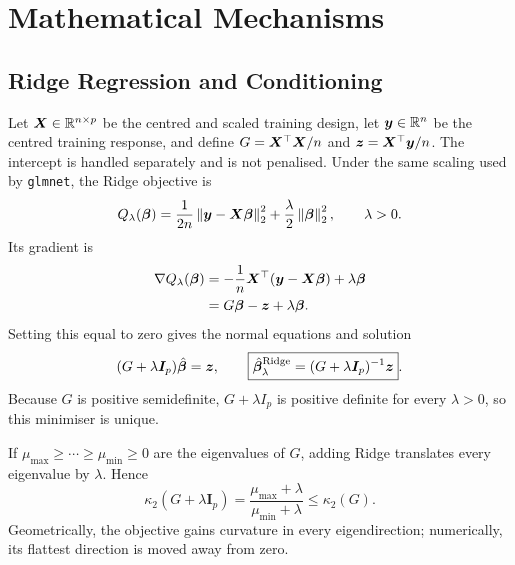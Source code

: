 \section{Mathematical Mechanisms}
\label{sec:math}

\subsection{Ridge Regression and Conditioning}
\label{sec:ridge-math}

Let $\bm{X}\in\mathbb{R}^{n\times p}$ be the centred and scaled training design, let
$\bm{y}\in\mathbb{R}^n$ be the centred training response, and define
$G=\bm{X}^\top\bm{X}/n$ and $\bm{z}=\bm{X}^\top\bm{y}/n$.  The intercept is handled
separately and is not penalised.  Under the same scaling used by
\texttt{glmnet}, the Ridge objective is
\begin{equation}
\label{eq:ridge-obj}
 Q_\lambda(\bm{\beta})=
 \frac{1}{2n}\left\lVert \bm{y}-\bm{X}\bm{\beta} \right\rVert_2^2
 +\frac{\lambda}{2}\left\lVert \bm{\beta} \right\rVert_2^2,
 \qquad \lambda>0.
\end{equation}
Its gradient is
\begin{align}
 \nabla Q_\lambda(\bm{\beta})
 &= -\frac{1}{n}\bm{X}^\top(\bm{y}-\bm{X}\bm{\beta})+\lambda\bm{\beta} \\
 &= G\bm{\beta}-\bm{z}+\lambda\bm{\beta}.
\end{align}
Setting this equal to zero gives the normal equations and solution
\begin{equation}
 (G+\lambda\bm{I}_p)\hat{\bm{\beta}}=\bm{z},
 \qquad
 \boxed{\hat{\bm{\beta}}^{\mathrm{Ridge}}_\lambda
 =(G+\lambda\bm{I}_p)^{-1}\bm{z}}.
\label{eq:ridge-solution}
\end{equation}
Because $G$ is positive semidefinite, $G+\lambda I_p$ is positive definite
for every $\lambda>0$, so this minimiser is unique.

If $\mu_{\max}\geq\cdots\geq\mu_{\min}\geq0$ are the eigenvalues of $G$,
adding Ridge translates every eigenvalue by $\lambda$.  Hence
\begin{equation}
 \kappa_2(G+\lambda\bm I_p)
 =\frac{\mu_{\max}+\lambda}{\mu_{\min}+\lambda}
 \leq \kappa_2(G).
\label{eq:ridge-condition}
\end{equation}
Geometrically, the objective gains curvature in every eigendirection;
numerically, its flattest direction is moved away from zero.

